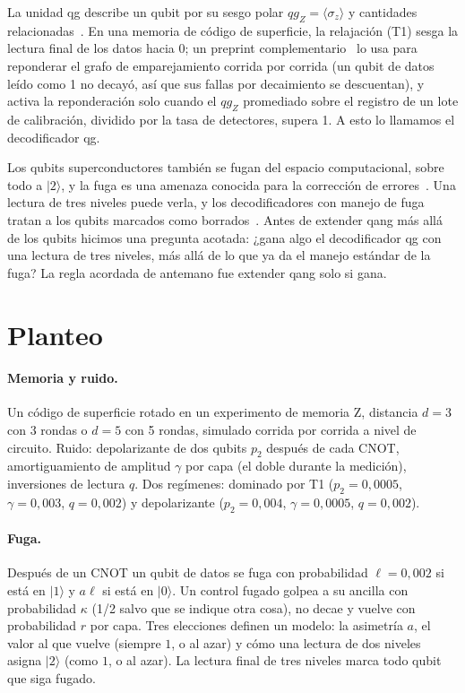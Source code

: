 \documentclass[11pt]{article}
\newcommand{\qgZ}{qg_Z}
\begin{document}
La unidad qg describe un qubit por su sesgo polar $\qgZ=\langle\sigma_z\rangle$ y cantidades
relacionadas~\cite{monteverde2026qang}. En una memoria de código de superficie, la relajación (T1)
sesga la lectura final de los datos hacia $0$; un preprint complementario~\cite{monteverde2026witness}
lo usa para reponderar el grafo de emparejamiento corrida por corrida (un qubit de datos leído como 1
no decayó, así que sus fallas por decaimiento se descuentan), y activa la reponderación solo cuando el
$\qgZ$ promediado sobre el registro de un lote de calibración, dividido por la tasa de detectores,
supera 1. A esto lo llamamos el decodificador qg.

Los qubits superconductores también se fugan del espacio computacional, sobre todo a $|2\rangle$, y la
fuga es una amenaza conocida para la corrección de
errores~\cite{aliferis2007leakage,suchara2015leakage,mcewen2021leakage}. Una lectura de tres niveles
puede verla, y los decodificadores con manejo de fuga tratan a los qubits marcados como
borrados~\cite{suchara2015leakage,wu2022erasure,varbanov2020leakage}. Antes de extender qang más allá
de los qubits hicimos una pregunta acotada: ¿gana algo el decodificador qg con una lectura de tres
niveles, más allá de lo que ya da el manejo estándar de la fuga? La regla acordada de antemano fue
extender qang solo si gana.

\section{Planteo}

\paragraph{Memoria y ruido.} Un código de superficie rotado en un experimento de memoria Z, distancia
$d=3$ con 3 rondas o $d=5$ con 5 rondas, simulado corrida por corrida a nivel de circuito. Ruido:
depolarizante de dos qubits $p_2$ después de cada CNOT, amortiguamiento de amplitud $\gamma$ por capa
(el doble durante la medición), inversiones de lectura $q$. Dos regímenes: dominado por T1
($p_2=0{,}0005$, $\gamma=0{,}003$, $q=0{,}002$) y depolarizante ($p_2=0{,}004$, $\gamma=0{,}0005$,
$q=0{,}002$).

\paragraph{Fuga.} Después de un CNOT un qubit de datos se fuga con probabilidad $\ell=0{,}002$ si está
en $|1\rangle$ y $a\ell$ si está en $|0\rangle$. Un control fugado golpea a su ancilla con probabilidad
$\kappa$ (1/2 salvo que se indique otra cosa), no decae y vuelve con probabilidad $r$ por capa. Tres
elecciones definen un modelo: la asimetría $a$, el valor al que vuelve (siempre $1$, o al azar) y cómo
una lectura de dos niveles asigna $|2\rangle$ (como $1$, o al azar). La lectura final de tres niveles
marca todo qubit que siga fugado.
\end{document}
